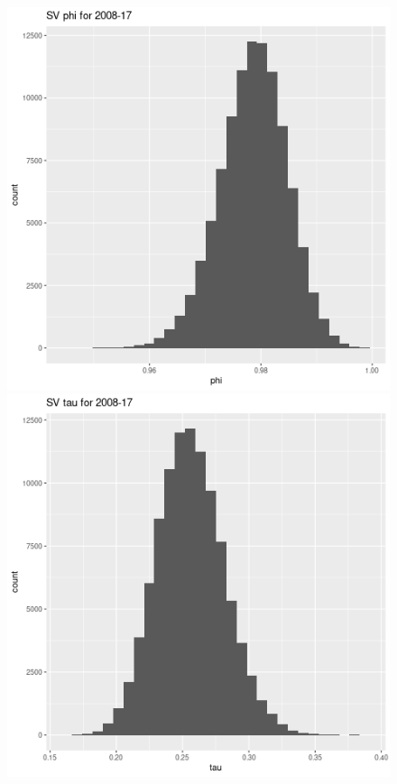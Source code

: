 \documentclass[12pt,letterpaper,reqno,fleqn]{article}
\begin{document}
\begin{figure}
\includegraphics[scale = .4]{svp0817}
\includegraphics[scale = .4]{svt0817}

\end{figure}
\end{document}
